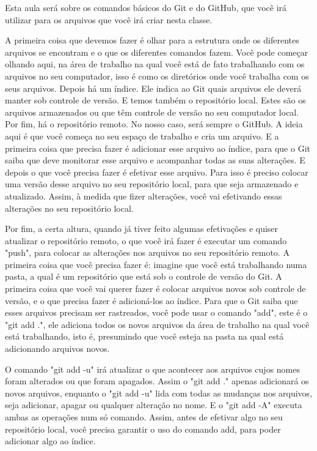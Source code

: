 Esta aula será sobre os comandos básicos do Git e do GitHub, que você irá utilizar para os arquivos que você irá criar nesta classe. 

A primeira coisa que devemos fazer é olhar para a estrutura onde os diferentes arquivos se encontram e o que os diferentes comandos fazem. Você pode começar olhando aqui, na área de trabalho na qual você está de fato trabalhando com os arquivos no seu computador, isso é como os diretórios onde você trabalha com os seus arquivos. Depois há um índice. Ele indica ao Git quais arquivos ele deverá manter sob controle de versão. E temos também o repositório local. Estes são os arquivos armazenados ou que têm controle de versão no seu computador local. Por fim, há o repositório remoto. No nosso caso, será sempre o GitHub. A ideia aqui é que você começa no seu espaço de trabalho e cria um arquivo. E a primeira coisa que precisa fazer é adicionar esse arquivo ao índice, para que o Git saiba que deve monitorar esse arquivo e acompanhar todas as suas alterações. E depois o que você precisa fazer é efetivar esse arquivo. Para isso é preciso colocar uma versão desse arquivo no seu repositório local, para que seja armazenado e atualizado. Assim, à medida que fizer alterações, você vai efetivando essas alterações no seu repositório local. 

Por fim, a certa altura, quando já tiver feito algumas efetivações e quiser atualizar o repositório remoto, o que você irá fazer é executar um comando "push", para colocar as alterações nos arquivos no seu repositório remoto. A primeira coisa que você precisa fazer é: imagine que você está trabalhando numa pasta, a qual é um repositório que está sob o controle de versão do Git. A primeira coisa que você vai querer fazer é colocar arquivos novos sob controle de versão, e o que precisa fazer é adicioná-los ao índice. Para que o Git saiba que esses arquivos precisam ser rastreados, você pode usar o comando "add", este é o "git add .", ele adiciona todos os novos arquivos da área de trabalho na qual você está trabalhando, isto é, presumindo que você esteja na pasta na qual está adicionando arquivos novos. 

O comando "git add -u" irá atualizar o que acontecer aos arquivos cujos nomes foram alterados ou que foram apagados. Assim o "git add ." apenas adicionará os novos arquivos, enquanto o "git add -u" lida com todas as mudanças nos arquivos, seja adicionar, apagar ou qualquer alteração no nome. E o "git add -A" executa ambas as operações num só comando. Assim, antes de efetivar algo no seu repositório local, você precisa garantir o uso do comando add, para poder adicionar algo ao índice. 

